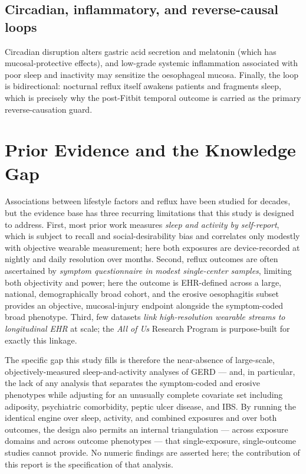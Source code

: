 \documentclass[11pt]{article}
\begin{document}
\subsection{Circadian, inflammatory, and reverse-causal loops}
Circadian disruption alters gastric acid secretion and melatonin (which has mucosal-protective effects),
and low-grade systemic inflammation associated with poor sleep and inactivity may sensitize the
oesophageal mucosa. Finally, the loop is bidirectional: nocturnal reflux itself awakens patients and
fragments sleep, which is precisely why the post-Fitbit temporal outcome is carried as the primary
reverse-causation guard.

\section{Prior Evidence and the Knowledge Gap}
Associations between lifestyle factors and reflux have been studied for decades, but the evidence base
has three recurring limitations that this study is designed to address. First, most prior work measures
\emph{sleep and activity by self-report}, which is subject to recall and social-desirability bias and
correlates only modestly with objective wearable measurement; here both exposures are device-recorded
at nightly and daily resolution over months. Second, reflux outcomes are often ascertained by
\emph{symptom questionnaire in modest single-center samples}, limiting both objectivity and power;
here the outcome is EHR-defined across a large, national, demographically broad cohort, and the erosive
oesophagitis subset provides an objective, mucosal-injury endpoint alongside the symptom-coded broad
phenotype. Third, few datasets \emph{link high-resolution wearable streams to longitudinal EHR} at
scale; the \emph{All of Us} Research Program is purpose-built for exactly this linkage.

The specific gap this study fills is therefore the near-absence of large-scale, objectively-measured
sleep-and-activity analyses of GERD --- and, in particular, the lack of any analysis that separates the
symptom-coded and erosive phenotypes while adjusting for an unusually complete covariate set including
adiposity, psychiatric comorbidity, peptic ulcer disease, and IBS. By running the identical engine over
sleep, activity, and combined exposures and over both outcomes, the design also permits an internal
triangulation --- across exposure domains and across outcome phenotypes --- that single-exposure,
single-outcome studies cannot provide. No numeric findings are asserted here; the contribution of this
report is the specification of that analysis.
\end{document}
